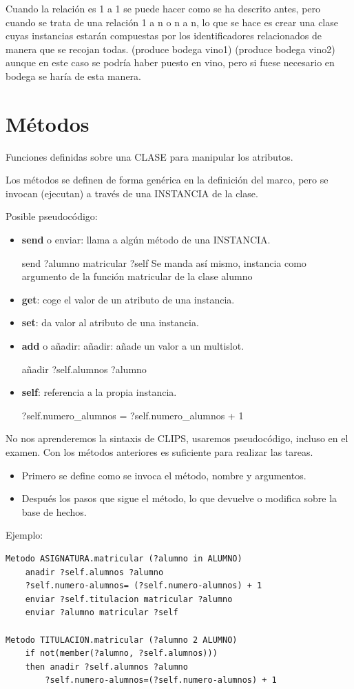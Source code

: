 \documentclass[12pt, twoside, openright]{report} %
\begin{document}
Cuando la relación es 1 a 1 se puede hacer como se ha descrito antes, pero cuando se trata de una relación 1 a n o n a n, lo que se hace es crear una clase cuyas instancias estarán compuestas por los identificadores relacionados de manera que se recojan todas. (produce bodega vino1) (produce bodega vino2) aunque en este caso se podría haber puesto en vino, pero si fuese necesario en bodega se haría de esta manera.

\section{Métodos}
Funciones definidas sobre una CLASE para manipular los atributos.

Los métodos se definen de forma genérica en la definición del marco, pero se invocan  (ejecutan) a través de una INSTANCIA de la clase.

Posible pseudocódigo:
\begin{itemize}
	\item \textbf{send} o enviar: llama a algún método de una INSTANCIA.
	
	send ?alumno matricular ?self Se manda así mismo, instancia como argumento de la función matricular de la clase alumno
	\item \textbf{get}: coge el valor de un atributo de una instancia.
	\item \textbf{set}: da valor al atributo de una instancia.
	\item \textbf{add} o añadir: añadir: añade un valor a un multislot.
	
	añadir ?self.alumnos ?alumno
	\item \textbf{self}: referencia a la propia instancia.
	
	?self.numero\_alumnos = ?self.numero\_alumnos + 1
\end{itemize}
\pagebreak

No nos aprenderemos la sintaxis de CLIPS, usaremos pseudocódigo, incluso en el examen. Con los métodos anteriores es suficiente para realizar las tareas.
\begin{itemize}
	\item Primero se define como se invoca el método, nombre y argumentos.
	\item Después los pasos que sigue el método, lo que devuelve o modifica sobre la base de hechos.
\end{itemize}

Ejemplo:
\begin{lstlisting}
Metodo ASIGNATURA.matricular (?alumno in ALUMNO)
	anadir ?self.alumnos ?alumno
	?self.numero-alumnos= (?self.numero-alumnos) + 1
	enviar ?self.titulacion matricular ?alumno
	enviar ?alumno matricular ?self

Metodo TITULACION.matricular (?alumno 2 ALUMNO)
	if not(member(?alumno, ?self.alumnos)))
	then anadir ?self.alumnos ?alumno
		?self.numero-alumnos=(?self.numero-alumnos) + 1
\end{lstlisting}
\end{document}

